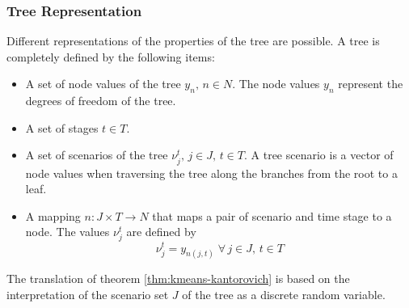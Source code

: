 \subsubsection{Tree Representation}
Different representations of the properties of the tree are possible. A tree is completely defined by the following items:
\begin{itemize}
\item A set of node values of the tree $y_n,\, n\in N$. The node values $y_n$ represent the degrees of freedom of the tree.
\item A set of stages $t\in T$.
\item A set of scenarios of the tree $\nu_j^t,\, j\in J,\, t\in T$.
  A tree scenario is a vector of node values when traversing the tree along the branches from the root to a leaf.
\item A mapping $n: J\times T\rightarrow N$ that maps  a pair of scenario and time stage to a node.
  The values $\nu_j^t$ are defined by
  \begin{equation}
    \label{eq:9}
    \nu_j^t = y_{n(j,t)}\;\forall\, j\in J,\, t\in T
  \end{equation}
\end{itemize}
The translation of theorem \ref{thm:kmeans-kantorovich} is based on the interpretation of the scenario set $J$ of the tree as a discrete random variable.
